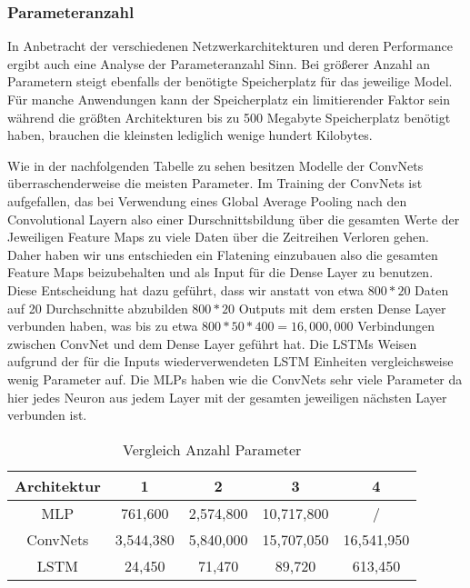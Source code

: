 \documentclass[acmtog, authorversion]{acmart} %
\begin{document}
\subsubsection{Parameteranzahl}

In Anbetracht der verschiedenen Netzwerkarchitekturen und deren Performance ergibt auch eine Analyse der Parameteranzahl Sinn. Bei größerer Anzahl an Parametern steigt ebenfalls der benötigte Speicherplatz für das jeweilige Model. Für manche Anwendungen kann der Speicherplatz ein limitierender Faktor sein während die größten Architekturen bis zu 500 Megabyte Speicherplatz benötigt haben, brauchen die kleinsten lediglich wenige hundert Kilobytes. 

Wie in der nachfolgenden Tabelle zu sehen besitzen Modelle der ConvNets überraschenderweise die meisten Parameter. Im Training der ConvNets ist aufgefallen, das bei Verwendung eines Global Average Pooling nach den Convolutional Layern also einer Durschnittsbildung über die gesamten Werte der Jeweiligen Feature Maps zu viele Daten über die Zeitreihen Verloren gehen. Daher haben wir uns entschieden ein Flatening einzubauen also die gesamten Feature Maps beizubehalten und als Input für die Dense Layer zu benutzen. Diese Entscheidung hat dazu geführt, dass wir anstatt von etwa $800*20$ Daten auf 20 Durchschnitte abzubilden $800*20$ Outputs mit dem ersten Dense Layer verbunden haben, was bis zu etwa $800*50*400 = 16,000,000$ Verbindungen zwischen ConvNet und dem Dense Layer geführt hat. 
Die LSTMs Weisen aufgrund der für die Inputs wiederverwendeten LSTM Einheiten vergleichsweise wenig Parameter auf. Die MLPs haben wie die ConvNets sehr viele Parameter da hier jedes Neuron aus jedem Layer mit der gesamten jeweiligen nächsten Layer verbunden ist.
\begin{table}[htp]
    \centering
    \begin{tabular}{|c|c|c|c|c|}
    \hline
         Architektur & 1 & 2 & 3 & 4  \\
    \hline
         MLP & 761,600 &  2,574,800 & 10,717,800 & / \\
    \hline
          ConvNets& 3,544,380 &  5,840,000 & 15,707,050 & 16,541,950\\
    \hline
        LSTM & 24,450 &  71,470 & 89,720 & 613,450 \\
    \hline
    \end{tabular}
    \caption{Vergleich Anzahl Parameter}
    \label{tab:my_label}
\end{table}
\end{document}
